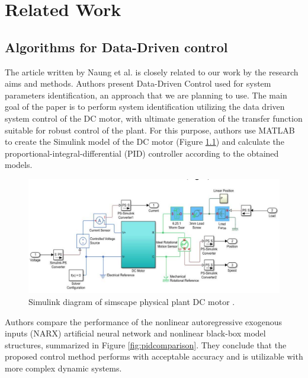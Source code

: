 \documentclass[]{final_report}
\begin{document}
\chapter{\label{chapter2} Related Work}

\section{Algorithms for Data-Driven control}
The article written by Naung et al. \cite{naung2018a} is closely related to our work by the research aims and methods. Authors present Data-Driven Control used for system parameters identification, an approach that we are planning to use. The main goal of the paper is to perform system identification utilizing the data driven system control of the DC motor, with ultimate generation of the transfer function suitable for robust control of the plant. For this purpose, authors use MATLAB to create the Simulink model of the DC motor (Figure \ref{fig:dcsimulink}) and calculate the proportional-integral-differential (PID) controller according to the obtained models.

\begin{figure} [h!]
\centerline{\includegraphics[width=.75\textwidth]{Screenshots for related work/1.png}}
\caption{Simulink diagram of simscape physical plant DC motor \cite{naung2018a}.}
\label{fig:dcsimulink}
\end{figure}

Authors compare the performance of the nonlinear autoregressive exogenous inputs (NARX) artificial neural network and nonlinear black-box model structures, summarized in Figure \ref{fig:pidcomparison}. They conclude that the proposed control method performs with acceptable accuracy and is utilizable with more complex dynamic systems.
\end{document}
